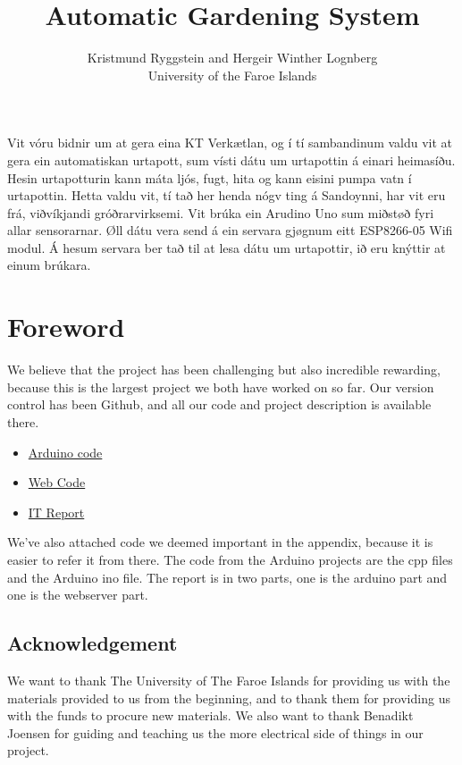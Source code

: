 \documentclass[a4paper,12pt,twoside,openright,titlepage]{book}
\title{Automatic Gardening System}
\author{Kristmund Ryggstein and Hergeir Winther Lognberg \\ University of the Faroe Islands\\}
\newenvironment{abstract}%
{\cleardoublepage\addcontentsline{toc}{chapter}{Abstract}\null\vfill\begin{center}%
\bfseries\abstractname\end{center}}%
{\vfill\null}
\begin{document}
\frontmatter
\maketitle

\frontmatter
\maketitle

\begin{abstract}
Vit vóru bidnir um at gera eina KT Verkætlan, og í tí sambandinum valdu vit at gera ein automatiskan urtapott, sum vísti dátu um urtapottin á einari heimasíðu. Hesin urtapotturin kann máta ljós, fugt, hita og kann eisini pumpa vatn í urtapottin. Hetta valdu vit, tí tað her henda nógv ting á Sandoynni, har vit eru frá, viðvíkjandi gróðrarvirksemi. Vit brúka ein Arudino Uno sum miðstøð fyri allar sensorarnar. Øll dátu vera send á ein servara gjøgnum eitt ESP8266-05 Wifi modul. Á hesum servara ber tað til at lesa dátu um urtapottir, ið eru knýttir at einum brúkara.

\end{abstract}

\cleardoublepage{}
\tableofcontents

\chapter{Foreword}

We believe that the project has been challenging but also incredible rewarding, because this is the largest project we both have worked on so far. Our version control has been Github, and all our code and project description is available there.
\begin{itemize}
\item\href{https://github.com/Hergeirs/Arduino2/tree/master/FWG7RQ3IRXT1DFL}{Arduino code}
\item \href{https://github.com/Hergeirs/Arduino-Web}{Web Code}
\item \href{https://github.com/Hergeirs/Arduino-Report}{IT Report}
\end{itemize}
We've also attached code we deemed important in the appendix, because it is easier to refer it from there. The code from the Arduino projects are the cpp files and the Arduino ino file. The report is in two parts, one is the arduino part and one is the webserver part.
\section*{Acknowledgement}
We want to thank The University of The Faroe Islands for providing us with the materials provided to us from the beginning, and to thank them for providing us with the funds to procure new materials. We also want to thank Benadikt Joensen for guiding  and teaching us the more electrical side of things in our project.
\end{document}
